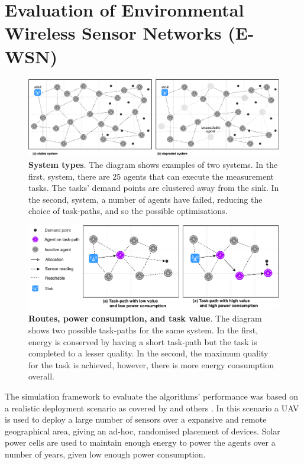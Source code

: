 \section{Evaluation of Environmental Wireless Sensor Networks (E-WSN)}
\label{section:experimental}	
\begin{figure}[ht]
	\centering
	\includegraphics[width=0.9\linewidth, trim={25pt 0pt 25pt 0pt, clip}]{system-types}
	\caption{\textbf{System types}. The diagram shows examples of two systems. In the first, \simulationSimple{}{} system, there are $25$ agents that can execute the measurement tasks. The tasks' demand points are clustered away from the sink. In the second, \simulationNodeFailure{}{} system, a number of agents have failed, reducing the choice of task-paths, and so the possible optimisations.}
	\label{fig:system-types}
\end{figure}
\begin{figure}[ht]
	\centering
	\includegraphics[width=0.9\linewidth, trim={25pt 0pt 25pt 0pt, clip}]{route-types}
	\caption{\textbf{Routes, power consumption, and task value}. The diagram shows two possible task-paths for the same system. In the first, energy is conserved by having a short task-path but the task is completed to a lesser quality. In the second, the maximum quality for the task is achieved, however, there is more energy consumption overall.}
	\label{fig:route_types}
\end{figure}

The simulation framework to evaluate the algorithms' performance was based on a realistic deployment scenario as covered by  \cite{Gomez2015} and others \citep{Jha2016, Avram}. In this scenario a UAV is used to deploy a large number of sensors over a expansive and remote geographical area, giving an ad-hoc, randomised placement of devices. Solar power cells are used to maintain enough energy to power the agents over a number of years, given low enough power consumption. 

